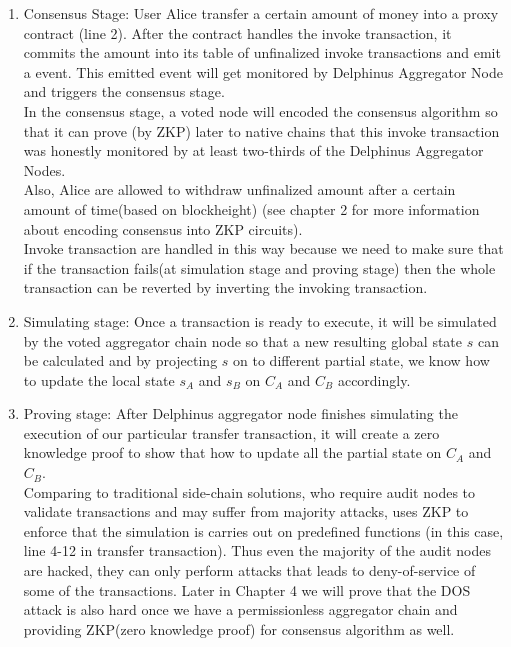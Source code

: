 \documentclass[pageno]{jpaper}
\begin{document}
\begin{enumerate}[leftmargin=*]
\item Consensus Stage:
User Alice transfer a certain amount of money into a proxy contract (line 2). After the contract handles the invoke transaction, it commits the amount into its table of unfinalized invoke transactions and emit a event. This emitted event will get monitored by Delphinus Aggregator Node and triggers the consensus stage.\\
\newline
In the consensus stage, a voted node will encoded the consensus algorithm so that it can prove (by ZKP) later to native chains that this invoke transaction was honestly monitored by at least two-thirds of the Delphinus Aggregator Nodes. \\
\newline
Also, Alice are allowed to withdraw unfinalized amount after a certain amount of time(based on blockheight) (see chapter 2 for more information about encoding consensus into ZKP circuits).\\
\newline
Invoke transaction are handled in this way because we need to make sure that if the transaction fails(at simulation stage and proving stage) then the whole transaction can be reverted by inverting the invoking transaction.\\
\item Simulating stage:
Once a transaction is ready to execute, it will be simulated by the voted aggregator chain node so that a new resulting global state $s$ can be calculated and by projecting $s$ on to different partial state, we know how to update the local state $s_A$ and $s_B$ on $C_A$ and $C_B$ accordingly.\\
\item Proving stage:
After Delphinus aggregator node finishes simulating the execution of our particular transfer transaction, it will create a zero knowledge proof to show that how to update all the partial state on $C_A$  and $C_B$.\\
\newline
Comparing to traditional side-chain solutions, who require audit nodes to validate transactions and may suffer from majority attacks, \dprotocol uses ZKP to enforce that the simulation is carries out on predefined functions (in this case, line 4-12 in transfer transaction). Thus even the majority of the audit nodes are hacked, they can only perform attacks that leads to deny-of-service of some of the transactions. Later in Chapter 4 we will prove that the DOS attack is also hard once we have a permissionless aggregator chain and providing ZKP(zero knowledge proof) for consensus algorithm as well.\\ 

\end{enumerate}
\end{document}
